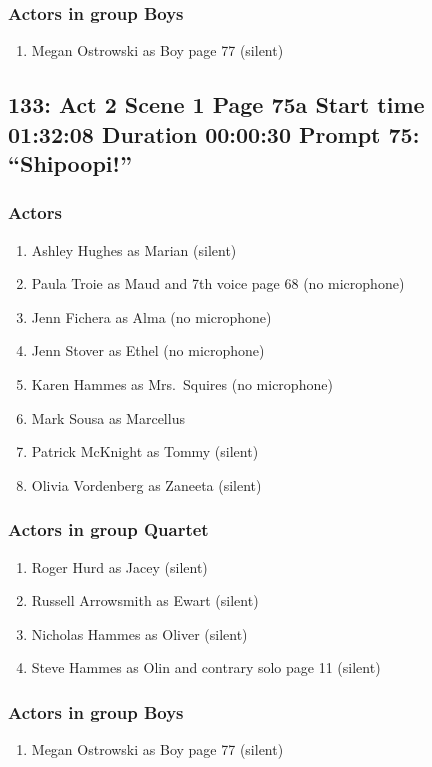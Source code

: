 \subsubsection{Actors in group Boys}
\begin{enumerate}
\item Megan Ostrowski as Boy page 77 (silent)
\end{enumerate}


\subsection{133: Act 2 Scene 1 Page 75a Start time 01:32:08 Duration 00:00:30 Prompt 75: ``Shipoopi!''}

\subsubsection{Actors}
\begin{enumerate}
\item Ashley Hughes as Marian (silent)
\item Paula Troie as Maud and 7th voice page 68 (no microphone)
\item Jenn Fichera as Alma (no microphone)
\item Jenn Stover as Ethel (no microphone)
\item Karen Hammes as Mrs.~Squires (no microphone)
\item Mark Sousa as Marcellus
\item Patrick McKnight as Tommy (silent)
\item Olivia Vordenberg as Zaneeta (silent)
\end{enumerate}
\subsubsection{Actors in group Quartet}
\begin{enumerate}
\item Roger Hurd as Jacey (silent)
\item Russell Arrowsmith as Ewart (silent)
\item Nicholas Hammes as Oliver (silent)
\item Steve Hammes as Olin and contrary solo page 11 (silent)
\end{enumerate}
\subsubsection{Actors in group Boys}
\begin{enumerate}
\item Megan Ostrowski as Boy page 77 (silent)
\end{enumerate}

